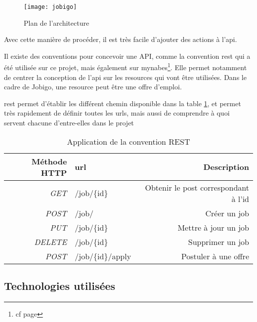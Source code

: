 \documentclass[rapport.tex]{subfiles}
\begin{document}
        \begin{figure}
            \centering
            \texttt{[image: jobigo]}
            \caption{Plan de l'architecture}
            \label{fig:jobigo}
        \end{figure}

        Avec cette manière de procéder, il est très facile d'ajouter des actions
        à l'\gls{api}.

        Il existe des conventions pour concevoir une API, comme la convention \gls{rest} qui a été utilisée
        sur ce projet, mais également sur mynabes\footnote{cf page \pageref{subsec:mynabes}}. Elle permet
        notamment de centrer la conception de l'\gls{api} sur les resources qui vont être utilisées.
        Dans le cadre de Jobigo, une resource peut être une offre d'emploi.

        \gls{rest} permet d'établir les différent chemin disponible dans la table \ref{table:rest}, et permet très rapidement
        de définir toutes les \glspl{url}, mais aussi de comprendre à quoi servent chacune d'entre-elles dans le projet

        \begin{table}
        \begin{tabular}{|r|l|r|}
            \hline
            Méthode HTTP & url & Description\\
            \hline
            \textit{GET} & /job/\{id\} & Obtenir le post correspondant à l'id\\ 
            \textit{POST} & /job/ & Créer un job\\
            \textit{PUT} & /job/\{id\} & Mettre à jour un job\\
            \textit{DELETE} & /job/\{id\} & Supprimer un job\\
            \textit{POST} & /job/\{id\}/apply & Postuler à une offre\\
            \hline
        \end{tabular}
            \caption{Application de la convention REST}\label{table:rest}
        \end{table}

        \subsection{Technologies utilisées}
\end{document}
